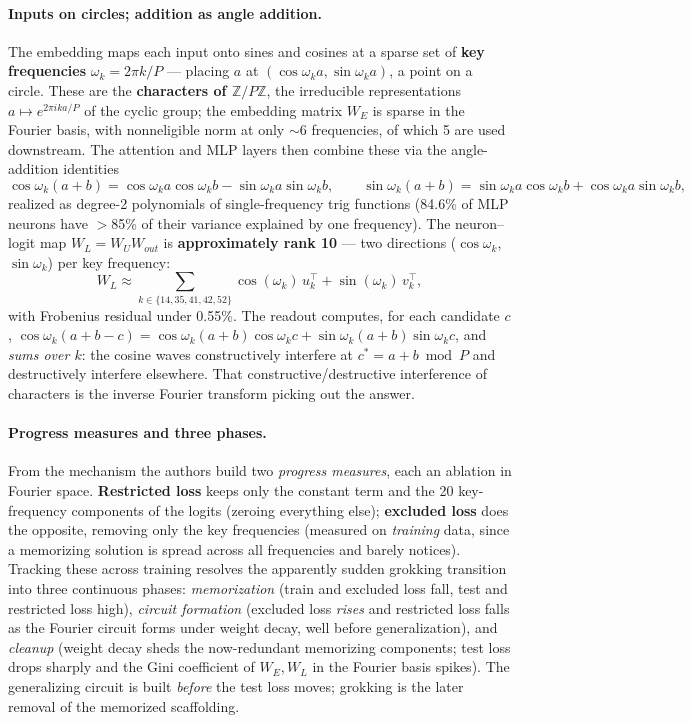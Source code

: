 \paragraph*{Inputs on circles; addition as angle addition.}
The embedding maps each input onto sines and cosines at a sparse set of \textbf{key frequencies} $\omega_k=2\pi k/P$ --- placing $a$ at $(\cos\omega_k a,\sin\omega_k a)$, a point on a circle. These are the \textbf{characters of $\mathbb{Z}/P\mathbb{Z}$}, the irreducible representations $a\mapsto e^{2\pi i k a/P}$ of the cyclic group; the embedding matrix $W_E$ is sparse in the Fourier basis, with nonneligible norm at only $\sim$6 frequencies, of which 5 are used downstream. The attention and MLP layers then combine these via the angle-addition identities
\[
\cos\omega_k(a{+}b)=\cos\omega_k a\cos\omega_k b-\sin\omega_k a\sin\omega_k b,
\qquad
\sin\omega_k(a{+}b)=\sin\omega_k a\cos\omega_k b+\cos\omega_k a\sin\omega_k b,
\]
realized as degree-2 polynomials of single-frequency trig functions (84.6\% of MLP neurons have $>$85\% of their variance explained by one frequency). The neuron--logit map $W_{L}=W_U W_{out}$ is \textbf{approximately rank 10} --- two directions ($\cos\omega_k$, $\sin\omega_k$) per key frequency:
\[
W_{L}\approx\sum_{k\in\{14,35,41,42,52\}}\cos(\omega_k)\,u_k^{\top}+\sin(\omega_k)\,v_k^{\top},
\]
with Frobenius residual under 0.55\%. The readout computes, for each candidate $c$, $\cos\omega_k(a+b-c)=\cos\omega_k(a{+}b)\cos\omega_k c+\sin\omega_k(a{+}b)\sin\omega_k c$, and \emph{sums over $k$}: the cosine waves constructively interfere at $c^{*}=a+b\bmod P$ and destructively interfere elsewhere. That constructive/destructive interference of characters is the inverse Fourier transform picking out the answer.

\paragraph*{Progress measures and three phases.}
From the mechanism the authors build two \emph{progress measures}, each an ablation in Fourier space. \textbf{Restricted loss} keeps only the constant term and the 20 key-frequency components of the logits (zeroing everything else); \textbf{excluded loss} does the opposite, removing only the key frequencies (measured on \emph{training} data, since a memorizing solution is spread across all frequencies and barely notices). Tracking these across training resolves the apparently sudden grokking transition into three continuous phases: \emph{memorization} (train and excluded loss fall, test and restricted loss high), \emph{circuit formation} (excluded loss \emph{rises} and restricted loss falls as the Fourier circuit forms under weight decay, well before generalization), and \emph{cleanup} (weight decay sheds the now-redundant memorizing components; test loss drops sharply and the Gini coefficient of $W_E,W_L$ in the Fourier basis spikes). The generalizing circuit is built \emph{before} the test loss moves; grokking is the later removal of the memorized scaffolding.


